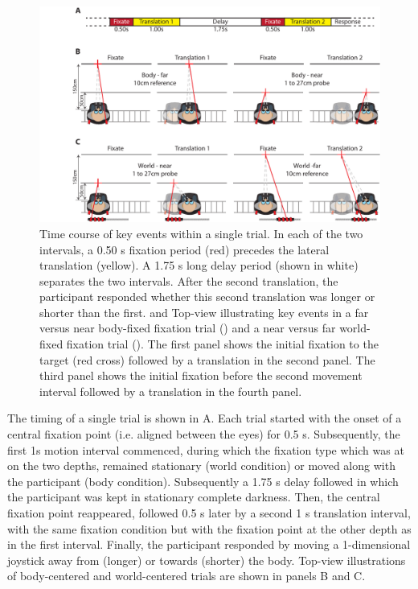
\begin{figure}
    \includegraphics[width=1.0\textwidth]{src/paper4/p4_figure1.pdf}

    \caption{ Time course  of key events within a single trial. In each of the two intervals, a 0.50 \si{\second} fixation period (red) precedes the lateral translation (yellow). A 1.75 \si{\second} long delay period (shown in white) separates the two intervals. After the second translation, the participant responded whether this second translation was longer or shorter than the first.  and  Top-view illustrating key events in a far versus near body-fixed fixation trial () and a near versus far world-fixed fixation trial (). The first panel shows the initial fixation to the target (red cross) followed by a translation in the second panel. The third panel shows the initial fixation before the second movement interval followed by a translation in the fourth panel.}
    \label{p4:fig1}    
\end{figure}
 
The timing of a single trial is shown in A. Each trial started with the onset of a central fixation point (i.e. aligned between the eyes) for 0.5 \si{\second}. Subsequently, the first 1s motion interval commenced, during which the fixation type which was at on the two depths, remained stationary (world condition) or moved along with the participant (body condition). Subsequently a 1.75 \si{\second} delay followed in which the participant was kept in stationary complete darkness. Then, the central fixation point reappeared, followed 0.5 \si{\second} later by a second 1 \si{\second} translation interval, with the same fixation condition but with the fixation point at the other depth as in the first interval. Finally, the participant responded by moving a 1-dimensional joystick away from (longer) or towards (shorter) the body. Top-view illustrations of body-centered and world-centered trials are shown in  panels B and C.

